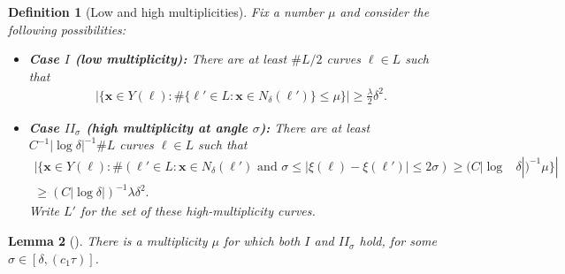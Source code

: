 \documentclass[12pt]{amsart}
\newcommand{\x}{{\bf{x}}}
\numberwithin{equation}{section}
\newtheorem{lemma}{Lemma}[section]
\newtheorem{definition}[lemma]{Definition}
\newcommand{\1}{\mathbbm{1}}
\renewcommand{\x}{\mathbf x}
\begin{document}
\begin{definition}[Low and high multiplicities]
    Fix a number $\mu$ and consider the following possibilities: 
    \begin{itemize}
        \item \textbf{Case $I$ (low multiplicity):} There are at least $\# L /2$ curves $\ell \in L$ such that 
        \begin{align}
            |\{\x \in Y(\ell) : 
            \# \{\ell' \in L : \x \in N_\delta(\ell')\} \leq \mu\}| \geq \frac{\lambda}{2} \delta^2. 
        \end{align}
        \item \textbf{Case $II_\sigma$ (high multiplicity at angle $\sigma$): } There are at least $C^{-1}|\log \delta|^{-1} \# L$ curves $\ell \in L$ such that 
        \begin{align}
            |\{\x \in Y(\ell) : \#(\ell' \in L : \x\in N_\delta(\ell') \text{ and } \sigma \leq |\xi(\ell)-\xi(\ell')| \leq 2\sigma) 
			\geq (C |\log &\delta|)^{-1} \mu\}|&\label{eq: high mult tube property} \\
			\geq (C |\log \delta|)^{-1} \lambda \delta^2.& \nonumber
        \end{align}
        Write $L'$ for the set of these high-multiplicity curves.
    \end{itemize}
\end{definition}

\begin{lemma}[]\label{lem: mult dichotomy}
    There is a multiplicity $\mu$ for which both $I$ and $II_\sigma$ hold, for some $\sigma \in [\delta, (c_1 \tau)]$. 
\end{lemma}
\end{document}
